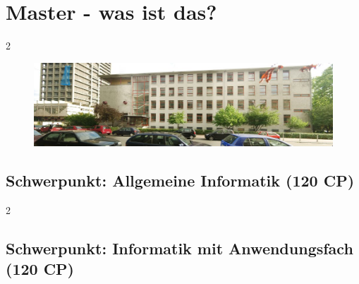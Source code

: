 \documentclass[a4paper,12pt]{scrartcl}
\newcommand{\spaltenanfang}{\begin{multicols}{2}}
\newcommand{\spaltenende}{\end{multicols}}
\begin{document}

%


\section{Master - was ist das?}
\spaltenanfang

\spaltenende

\begin{figure}[bt]
\begin{center}
\includegraphics[scale=1.0]{fotos/rm_pano}
\end{center}
\end{figure}


\subsection{Schwerpunkt: Allgemeine Informatik (120 CP)}

\vspace{-2mm}


\spaltenanfang

\spaltenende

\subsection{Schwerpunkt: Informatik mit Anwendungsfach (120 CP)}
\end{document}
